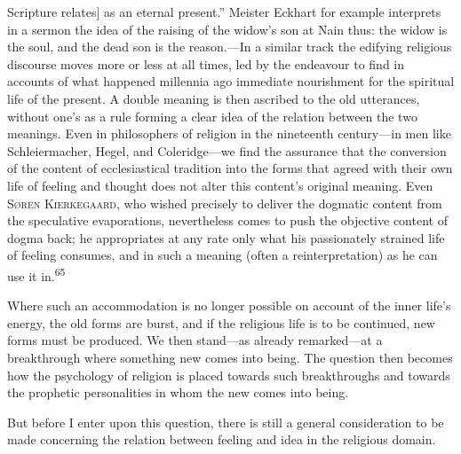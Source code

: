 \documentclass[12pt,a4paper]{book}
\newcommand{\opage}[1]{\marginnote{\footnotesize\textit{[#1]}}}
\begin{document}
Scripture relates] as an eternal present.'' Meister Eckhart for example interprets in a sermon the idea of
the raising of the widow's son at Nain thus: the widow is the soul, and the dead son is the reason.---In a
similar track the edifying religious discourse moves more or less at all times, 
\opage{122}led by the endeavour to find
in accounts of what happened millennia ago immediate nourishment for the spiritual life of the present. A
double meaning is then ascribed to the old utterances, without one's as a rule forming a clear idea of the
relation between the two meanings. Even in philosophers of religion in the nineteenth century---in men like
Schleiermacher, Hegel, and Coleridge---we find the assurance that the conversion of the content of
ecclesiastical tradition into the forms that agreed with their own life of feeling and thought does not
alter this content's original meaning. Even \textsc{Søren Kierkegaard}, who wished precisely to deliver the
dogmatic content from the speculative evaporations, nevertheless comes to push the objective content of
dogma back; he appropriates at any rate only what his passionately strained life of feeling consumes, and in
such a meaning (often a reinterpretation) as he can use it in.\textsuperscript{65}

Where such an accommodation is no longer possible on account of the inner life's energy, the old forms are
burst, and if the religious life is to be continued, new forms must be produced. We then stand---as already
remarked---at a breakthrough where something new comes into being. The question then becomes how the
psychology of religion is placed towards such breakthroughs and towards the prophetic personalities in whom
the new comes into being.

But before I enter upon this question, there is still a general consideration to be made concerning the
relation between feeling and idea in the religious domain.

\medskip
\end{document}
